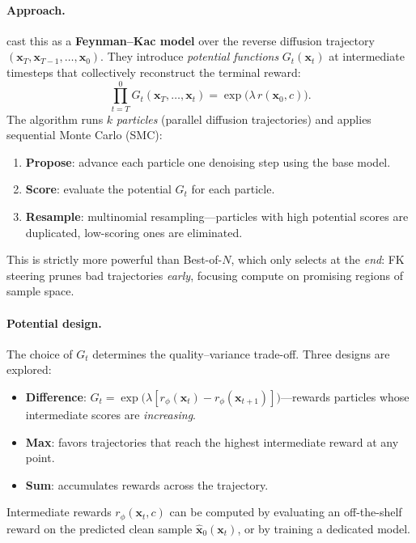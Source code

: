 \documentclass[11pt]{article}
\begin{document}
\paragraph{Approach.}
\citet{singhal2025fksteering} cast this as a \textbf{Feynman--Kac model} over the reverse diffusion trajectory $(\mathbf{x}_T, \mathbf{x}_{T-1}, \ldots, \mathbf{x}_0)$.
They introduce \emph{potential functions} $G_t(\mathbf{x}_t)$ at intermediate timesteps that collectively reconstruct the terminal reward:
\begin{equation}
    \prod_{t=T}^{0} G_t(\mathbf{x}_T, \ldots, \mathbf{x}_t) = \exp\bigl(\lambda\, r(\mathbf{x}_0, c)\bigr).
\end{equation}
The algorithm runs $k$ \emph{particles} (parallel diffusion trajectories) and applies sequential Monte Carlo (SMC):
\begin{enumerate}
    \item \textbf{Propose}: advance each particle one denoising step using the base model.
    \item \textbf{Score}: evaluate the potential $G_t$ for each particle.
    \item \textbf{Resample}: multinomial resampling---particles with high potential scores are duplicated, low-scoring ones are eliminated.
\end{enumerate}
This is strictly more powerful than Best-of-$N$, which only selects at the \emph{end}: FK steering prunes bad trajectories \emph{early}, focusing compute on promising regions of sample space.

\paragraph{Potential design.}
The choice of $G_t$ determines the quality--variance trade-off. Three designs are explored:
\begin{itemize}
    \item \textbf{Difference}: $G_t = \exp\bigl(\lambda[r_\phi(\mathbf{x}_t) - r_\phi(\mathbf{x}_{t+1})]\bigr)$---rewards particles whose intermediate scores are \emph{increasing}.
    \item \textbf{Max}: favors trajectories that reach the highest intermediate reward at any point.
    \item \textbf{Sum}: accumulates rewards across the trajectory.
\end{itemize}
Intermediate rewards $r_\phi(\mathbf{x}_t, c)$ can be computed by evaluating an off-the-shelf reward on the predicted clean sample $\hat{\mathbf{x}}_0(\mathbf{x}_t)$, or by training a dedicated model.
\end{document}
